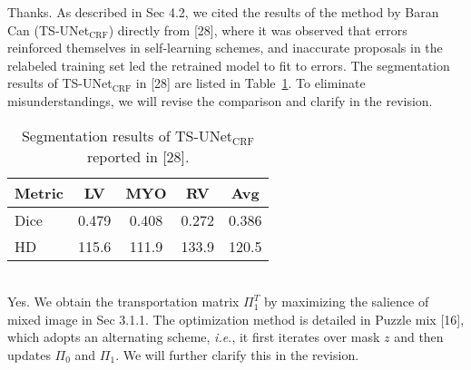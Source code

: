 \documentclass[10pt,twocolumn,letterpaper]{article}
\begin{document}
\newline{}
Thanks. As described in Sec 4.2, we cited the results of the method by Baran Can (TS-UNet$_{\text{CRF}}$) directly from [28], where it was observed that errors reinforced themselves in self-learning schemes, and inaccurate proposals in the relabeled training set led the retrained model to fit to errors.
The segmentation results of TS-UNet$_{\text{CRF}}$ in [28] are listed in Table~\ref{tab:tab1}.
To eliminate misunderstandings, we will revise the comparison and clarify in the revision.
\begin{table}[!h]
  \centering
  \caption{Segmentation results of TS-UNet$_{\text{CRF}}$ reported in [28].}
  \begin{tabular}{@{}lcccc@{}}
    \toprule
    Metric & LV & MYO & RV & Avg \\
    \midrule
    Dice & 0.479& 0.408&0.272& 0.386\\
    HD & 115.6&111.9&133.9& 120.5\\
    \bottomrule
  \end{tabular}
  \label{tab:tab1}
\end{table}
\hfill
\\
\newline{}
Yes. We obtain the transportation matrix $\Pi_1^T$ by maximizing the salience of mixed image in Sec 3.1.1. 
The optimization method is detailed in Puzzle mix [16], which adopts an alternating scheme, \textit{i.e.}, it first iterates over mask $z$ and then updates $\Pi_0$ and $\Pi_1$.
We will further clarify this in the revision.
\hfill
\\
\end{document}
